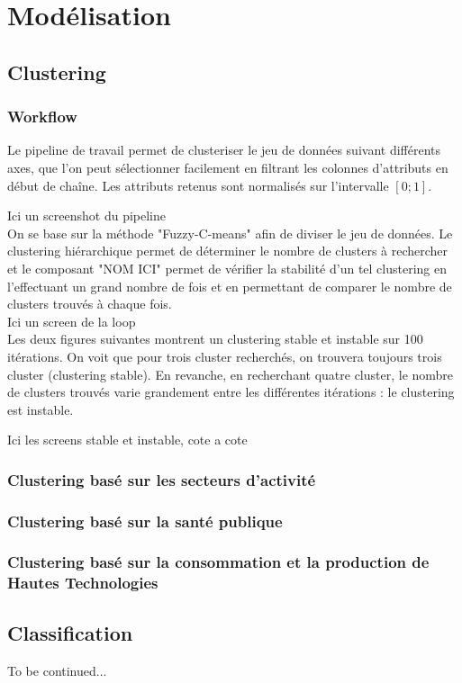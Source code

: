 \section{Modélisation}

\subsection{Clustering}

\subsubsection{Workflow}

Le pipeline de travail permet de clusteriser le jeu de données suivant
différents axes, que l'on peut sélectionner facilement en filtrant les
colonnes d'attributs en début de chaîne. Les attributs retenus sont
normalisés sur l'intervalle $[ 0 ; 1 ]$.

Ici un screenshot du pipeline\\

On se base sur la méthode "Fuzzy-C-means" afin de diviser le jeu de
données. Le clustering hiérarchique permet de déterminer le nombre de
clusters à rechercher et le composant "NOM ICI" permet de vérifier la stabilité
d'un tel clustering en l'effectuant un grand nombre de fois et en
permettant de comparer le nombre de clusters trouvés à chaque fois.\\

Ici un screen de la loop\\

Les deux figures suivantes montrent un clustering stable et instable sur
100 itérations. On voit que pour trois cluster recherchés, on trouvera
toujours trois cluster (clustering stable). En revanche, en recherchant
quatre cluster, le nombre de clusters trouvés varie grandement entre les
différentes itérations : le clustering est instable.

Ici les screens stable et instable, cote a cote\\


\subsubsection{Clustering basé sur les secteurs d'activité}

\subsubsection{Clustering basé sur la santé publique}

\subsubsection{Clustering basé sur la consommation et la production de
Hautes Technologies}

\subsection{Classification}

To be continued...
